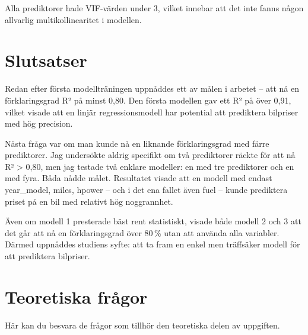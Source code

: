 \documentclass[
  letterpaper,
  DIV=11,
  numbers=noendperiod]{scrreprt}
\begin{document}
Alla prediktorer hade VIF-värden under 3, vilket innebar att det inte
fanns någon allvarlig multikollinearitet i modellen.


\chapter{Slutsatser}\label{slutsatser}

Redan efter första modellträningen uppnåddes ett av målen i arbetet --
att nå en förklaringsgrad R² på minst 0,80. Den första modellen gav ett
R² på över 0,91, vilket visade att en linjär regressionsmodell har
potential att prediktera bilpriser med hög precision.

Nästa fråga var om man kunde nå en liknande förklaringsgrad med färre
prediktorer. Jag undersökte aldrig specifikt om två prediktorer räckte
för att nå R² \textgreater{} 0,80, men jag testade två enklare modeller:
en med tre prediktorer och en med fyra. Båda nådde målet. Resultatet
visade att en modell med endast year\_model, miles, hpower -- och i det
ena fallet även fuel -- kunde prediktera priset på en bil med relativt
hög noggrannhet.

Även om modell 1 presterade bäst rent statistiskt, visade både modell 2
och 3 att det går att nå en förklaringsgrad över 80\,\% utan att använda
alla variabler. Därmed uppnåddes studiens syfte: att ta fram en enkel
men träffsäker modell för att prediktera bilpriser.


\chapter{Teoretiska frågor}\label{teoretiska-fruxe5gor}

Här kan du besvara de frågor som tillhör den teoretiska delen av
uppgiften.
\end{document}
